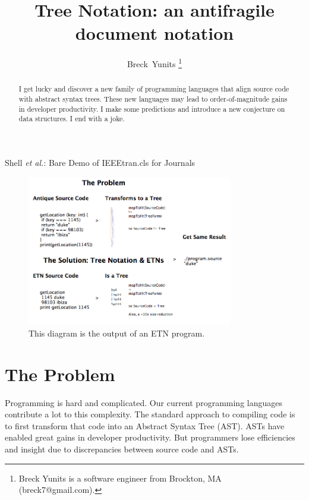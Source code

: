 \documentclass[journal]{IEEEtran}
\begin{document}
\title{Tree Notation: an antifragile document notation}

\author{Breck~Yunits%
\thanks{Breck Yunits is a software engineer from Brockton, MA (breck7@gmail.com).}%
}

%
{Shell \MakeLowercase{\textit{et al.}}: Bare Demo of IEEEtran.cls for Journals}

\maketitle


\begin{abstract}
I get lucky and discover a new family of programming languages that align source code with abstract syntax trees. These new languages may lead to order-of-magnitude gains in developer productivity. I make some predictions and introduce a new conjecture on data structures. I end with a joke.

\end{abstract}

\IEEEpeerreviewmaketitle

\begin{figure}[ht!]
\centering
\includegraphics[width=90mm]{treenotation.png}
\caption{This diagram is the output of an ETN program.}
\end{figure}

\section{The Problem}

Programming is hard and complicated. Our current programming languages contribute a lot to this complexity. The standard approach to compiling code is to first transform that code into an Abstract Syntax Tree (AST). ASTs have enabled great gains in developer productivity. But programmers lose efficiencies and insight due to discrepancies between source code and ASTs.
\end{document}
